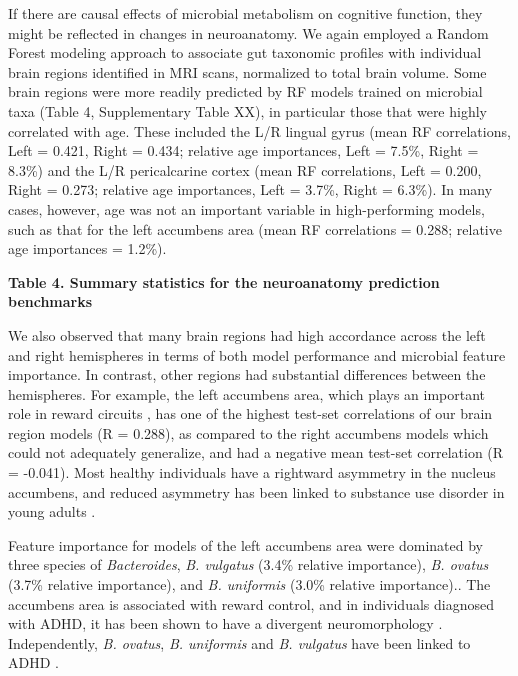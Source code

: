 \documentclass[a4paper]{article}
\begin{document}
If there are causal effects of microbial metabolism on cognitive
function, they might be reflected in changes in neuroanatomy. We again
employed a Random Forest modeling approach to associate gut taxonomic
profiles with individual brain regions identified in MRI scans,
normalized to total brain volume. Some brain regions were more readily
predicted by RF models trained on microbial taxa (Table 4, Supplementary
Table XX), in particular those that were highly correlated with age.
These included the L/R lingual gyrus (mean RF correlations, Left =
0.421, Right = 0.434; relative age importances, Left = 7.5\%, Right =
8.3\%) and the L/R pericalcarine cortex (mean RF correlations, Left =
0.200, Right = 0.273; relative age importances, Left = 3.7\%, Right =
6.3\%). In many cases, however, age was not an important variable in
high-performing models, such as that for the left accumbens area (mean
RF correlations = 0.288; relative age importances = 1.2\%).

\textbf{Table 4. Summary statistics for the neuroanatomy prediction benchmarks}

We also observed that many brain regions had high accordance across the
left and right hemispheres in terms of both model performance and
microbial feature importance. In contrast, other regions had substantial
differences between the hemispheres. For example, the left accumbens
area, which plays an important role in reward circuits
\cite{ernstAmygdalaNucleusAccumbens2005,yauNucleusAccumbensResponse2012},
has one of the highest test-set correlations of our
brain region models (R = 0.288), as compared to the right accumbens
models which could not adequately generalize, and had a negative mean
test-set correlation (R = -0.041). Most healthy individuals have a
rightward asymmetry in the nucleus accumbens, and reduced asymmetry has
been linked to substance use disorder in young adults
\cite{caoMappingCorticalSubcortical2021}.

Feature importance for models of the left accumbens area were dominated
by three species of \emph{Bacteroides}, \emph{B. vulgatus} (3.4\%
relative importance), \emph{B. ovatus} (3.7\% relative importance), and
\emph{B. uniformis} (3.0\% relative importance).. The accumbens area is
associated with reward control, and in individuals diagnosed with ADHD,
it has been shown to have a divergent neuromorphology
\cite{hoogmanSubcorticalBrainVolume2017}.
Independently, \emph{B. ovatus}, \emph{B. uniformis} and
\emph{B. vulgatus} have been linked to ADHD
\cite{wangGutMicrobiotaDietary2020}.
\end{document}
